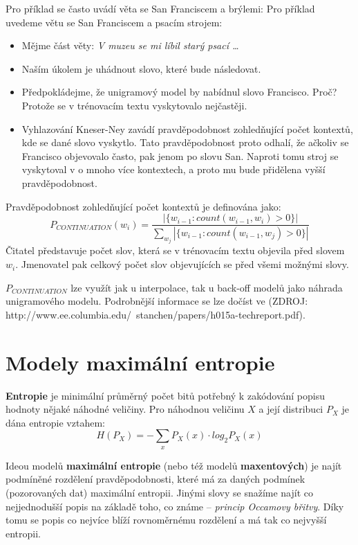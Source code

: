 \documentclass[12pt,a4paper]{report}
\begin{document}
Pro příklad se často uvádí věta se San Franciscem a brýlemi:
Pro příklad uvedeme větu se San Franciscem a psacím strojem:
\begin{itemize}
\item{Mějme část věty: \textit{V muzeu se mi líbil starý psací \ldots}}
\item{Naším úkolem je uhádnout slovo, které bude následovat.}
\item{Předpokládejme, že unigramový model by nabídnul slovo Francisco. Proč? Protože se v trénovacím textu vyskytovalo nejčastěji.}
\item{Vyhlazování Kneser-Ney zavádí pravděpodobnost zohledňující počet kontextů, kde se dané slovo vyskytlo. Tato pravděpodobnost proto odhalí, že ačkoliv se Francisco objevovalo často, pak jenom po slovu San. Naproti tomu stroj se vyskytoval v o mnoho více kontextech, a proto mu bude přidělena vyšší pravděpodobnost.}
\end{itemize}

Pravděpodobnost zohledňující počet kontextů je definována jako:
\begin{equation}
P_{CONTINUATION}(w_i) = \frac{|\{w_{i-1} : count(w_{i-1}, w_i) > 0 \}|}{\sum_{w_j} |\{w_{i-1} : count(w_{i-1}, w_j) > 0 \}|}
\end{equation}
Čitatel představuje počet slov, která se v trénovacím textu objevila před slovem $w_i$. Jmenovatel pak celkový počet slov objevujících se před všemi možnými slovy.

$P_{CONTINUATION}$ lze využít jak u interpolace, tak u back-off modelů jako náhrada unigramového modelu. Podrobnější informace se lze dočíst ve (ZDROJ: http://www.ee.columbia.edu/~stanchen/papers/h015a-techreport.pdf).

\section{Modely maximální entropie}

\textbf{Entropie} je minimální průměrný počet bitů potřebný k zakódování popisu hodnoty nějaké náhodné veličiny. Pro náhodnou veličinu $X$ a její distribuci $P_X$ je dána entropie vztahem:
\begin{equation}\label{eq:entropy}
H(P_X) = - \sum_x P_X(x) \cdot log_2 P_X(x)
\end{equation}

Ideou modelů \textbf{maximální entropie} (nebo též modelů \textbf{maxentových}) je najít podmíněné rozdělení pravděpodobnosti, které má za daných podmínek (pozorovaných dat) maximální entropii. Jinými slovy se snažíme najít co nejjednodušší popis na základě toho, co známe -- \textit{princip Occamovy břitvy}. Díky tomu se popis co nejvíce blíží rovnoměrnému rozdělení a má tak co nejvyšší entropii.
\end{document}
